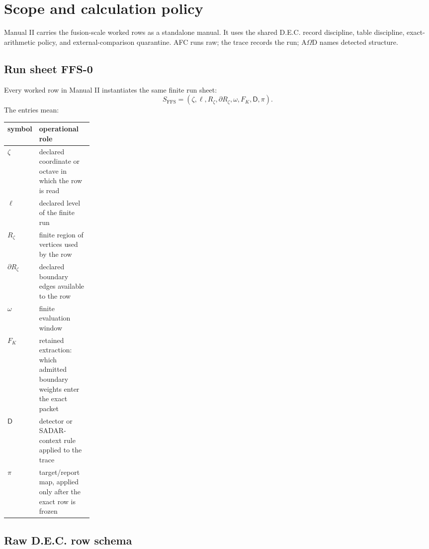 \ifdefined\AODManualII
\section{Scope and calculation policy}

Manual II carries the fusion-scale worked rows as a standalone manual. It uses the shared D.E.C. record discipline, table discipline, exact-arithmetic policy, and external-comparison quarantine. AFC runs raw; the trace records the run; A$\Omega$D names detected structure.

\subsection{Run sheet FFS-0}

Every worked row in Manual II instantiates the same finite run sheet:
\[
S_{\mathrm{FFS}}=(\zeta,\ell,R_{\zeta},\partial R_{\zeta},\omega,F_K,\mathsf D,\pi).
\]
The entries mean:
\begin{center}
\begin{tabularx}{0.96\linewidth}{@{}p{0.20\linewidth}X@{}}
\toprule
symbol & operational role \\
\midrule
$\zeta$ & declared coordinate or octave in which the row is read \\
$\ell$ & declared level of the finite run \\
$R_{\zeta}$ & finite region of vertices used by the row \\
$\partial R_{\zeta}$ & declared boundary edges available to the row \\
$\omega$ & finite evaluation window \\
$F_K$ & retained extraction: which admitted boundary weights enter the exact packet \\
$\mathsf D$ & detector or SADAR-context rule applied to the trace \\
$\pi$ & target/report map, applied only after the exact row is frozen \\
\bottomrule
\end{tabularx}
\end{center}

\subsection{Raw D.E.C. row schema}

